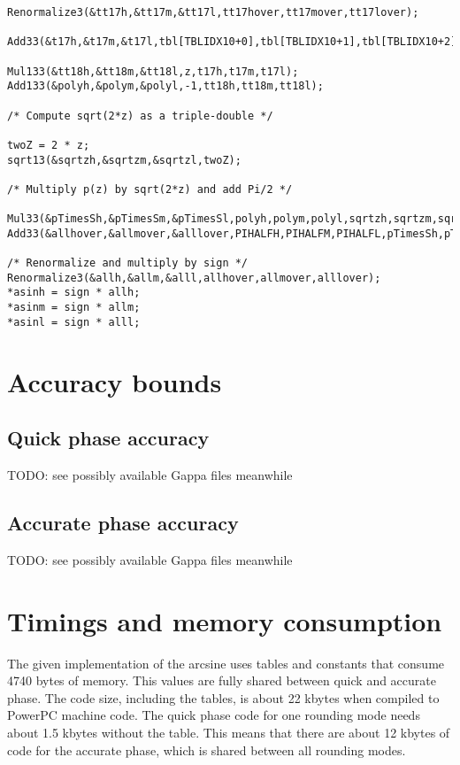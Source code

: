 \begin{lstlisting}[caption={High path accurate phase polynomial approximation},firstnumber=1]
Renormalize3(&tt17h,&tt17m,&tt17l,tt17hover,tt17mover,tt17lover);                              

Add33(&t17h,&t17m,&t17l,tbl[TBLIDX10+0],tbl[TBLIDX10+1],tbl[TBLIDX10+2],tt17h,tt17m,tt17l);    

Mul133(&tt18h,&tt18m,&tt18l,z,t17h,t17m,t17l);                                                 
Add133(&polyh,&polym,&polyl,-1,tt18h,tt18m,tt18l);                                             

/* Compute sqrt(2*z) as a triple-double */

twoZ = 2 * z;
sqrt13(&sqrtzh,&sqrtzm,&sqrtzl,twoZ);                                                           

/* Multiply p(z) by sqrt(2*z) and add Pi/2 */

Mul33(&pTimesSh,&pTimesSm,&pTimesSl,polyh,polym,polyl,sqrtzh,sqrtzm,sqrtzl);                    
Add33(&allhover,&allmover,&alllover,PIHALFH,PIHALFM,PIHALFL,pTimesSh,pTimesSm,pTimesSl);        

/* Renormalize and multiply by sign */
Renormalize3(&allh,&allm,&alll,allhover,allmover,alllover);                                     
*asinh = sign * allh;
*asinm = sign * allm;
*asinl = sign * alll;
\end{lstlisting} 

\section{Accuracy bounds}\label{sec:asinaccuracy}

\subsection{Quick phase accuracy}\label{subsec:asinquickphaseaccu}

TODO: see possibly available Gappa files meanwhile


\subsection{Accurate phase accuracy}\label{subsec:asinaccuratephaseaccu}

TODO: see possibly available Gappa files meanwhile


\section{Timings and memory consumption}\label{sec:asintimingmemory}
The given implementation of the arcsine uses tables and constants that
consume 4740 bytes of memory. This values are fully shared between
quick and accurate phase. The code size, including the tables, is
about 22 kbytes when compiled to PowerPC machine code. The quick phase
code for one rounding mode needs about 1.5 kbytes without the table.
This means that there are about 12 kbytes of code for the accurate
phase, which is shared between all rounding modes.

